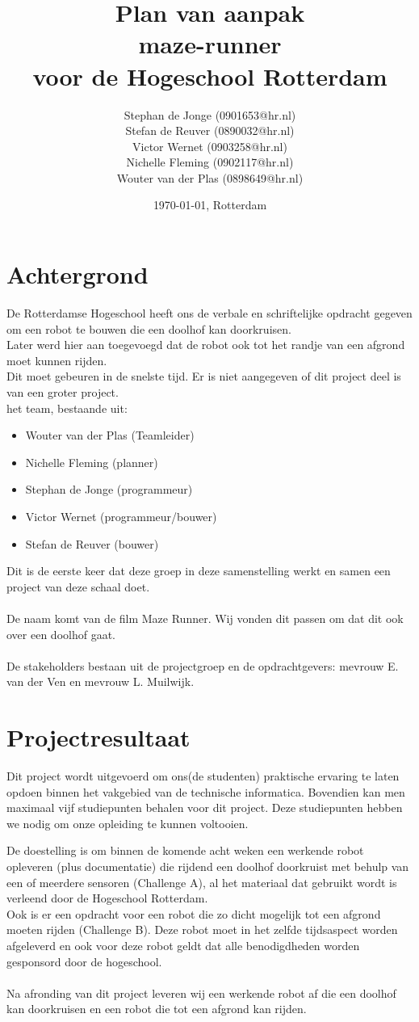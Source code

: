 \documentclass[oneside]{book}
\title{Plan van aanpak\\
maze-runner\\
\normalsize voor de Hogeschool Rotterdam
}
\author{
	Stephan de Jonge (0901653@hr.nl)\\
	Stefan de Reuver (0890032@hr.nl)\\
	Victor Wernet (0903258@hr.nl)\\
	Nichelle Fleming (0902117@hr.nl)\\
	Wouter van der Plas (0898649@hr.nl)
}
\date{\today, Rotterdam}
\begin{document}
\maketitle
\tableofcontents


\chapter{Achtergrond}

De Rotterdamse Hogeschool heeft ons de verbale en schriftelijke opdracht gegeven om een robot te bouwen die een doolhof kan doorkruisen.\\
Later werd hier aan toegevoegd dat de robot ook tot het randje van een afgrond moet kunnen rijden.\\
Dit moet gebeuren in de snelste tijd. Er is niet aangegeven of dit project deel is van een groter project.\\
het team, bestaande uit:\\
\begin{itemize}
	\item Wouter van der Plas (Teamleider)
	\item Nichelle Fleming (planner)
	\item Stephan de Jonge (programmeur)
	\item Victor Wernet (programmeur/bouwer)
	\item Stefan de Reuver (bouwer)
\end{itemize}	
Dit is de eerste keer dat deze groep in deze samenstelling werkt en samen een project van deze schaal doet.\\
\\
De naam komt van de film Maze Runner. Wij vonden dit passen om dat dit ook over een doolhof gaat.\\
\\
De stakeholders bestaan uit de projectgroep en de opdrachtgevers: mevrouw E. van der Ven en mevrouw L. Muilwijk.

\clearpage
\chapter{Projectresultaat}
Dit project wordt uitgevoerd om ons(de studenten) praktische ervaring te laten opdoen binnen het vakgebied van de technische informatica.
Bovendien kan men maximaal vijf studiepunten behalen voor dit project.
Deze studiepunten hebben we nodig om onze opleiding te kunnen voltooien.

De doestelling is om binnen de komende acht weken een werkende robot opleveren (plus documentatie) die rijdend een doolhof doorkruist met behulp van een of meerdere sensoren (Challenge A), al het materiaal dat gebruikt wordt is verleend door de Hogeschool Rotterdam.\\
Ook is er een opdracht voor een robot die zo dicht mogelijk tot een afgrond moeten rijden (Challenge B). Deze robot moet in het zelfde tijdsaspect worden afgeleverd en ook voor deze robot geldt dat alle benodigdheden worden gesponsord door de hogeschool.\\
\\
Na afronding van dit project leveren wij een werkende robot af die een doolhof kan doorkruisen en een robot die tot een afgrond kan rijden.
\clearpage
\end{document}
